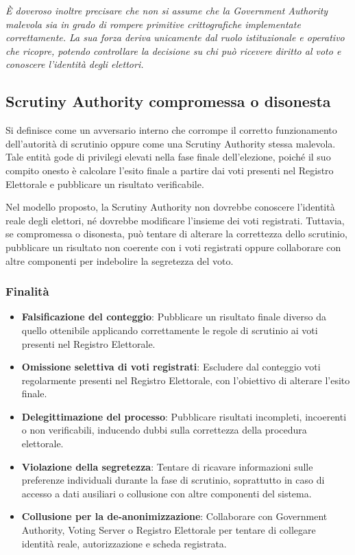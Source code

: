 \documentclass[a4paper,12pt]{article}
\begin{document}
\textit{È doveroso inoltre precisare che non si assume che la Government Authority malevola sia in grado di rompere primitive crittografiche implementate correttamente. La sua forza deriva unicamente dal ruolo istituzionale e operativo che ricopre, potendo controllare la decisione su chi può ricevere diritto al voto e conoscere l'identità degli elettori.}

\subsection{Scrutiny Authority compromessa o disonesta}

Si definisce come un avversario interno che corrompe il corretto funzionamento dell'autorità di scrutinio oppure come una Scrutiny Authority stessa malevola. Tale entità gode di privilegi elevati nella fase finale dell'elezione,
poiché il suo compito onesto è calcolare l'esito finale a partire dai voti presenti nel Registro Elettorale e pubblicare un risultato verificabile.

Nel modello proposto, la Scrutiny Authority non dovrebbe conoscere l'identità reale degli elettori, né dovrebbe modificare l'insieme dei voti registrati. Tuttavia, se compromessa o disonesta, può tentare di alterare la correttezza dello scrutinio, pubblicare un risultato non coerente con i voti registrati oppure collaborare con altre componenti per indebolire la segretezza del voto.

\subsubsection*{Finalità}

\begin{itemize}
    \item \textbf{Falsificazione del conteggio}: Pubblicare un risultato finale diverso da quello ottenibile applicando correttamente le regole di scrutinio ai voti presenti nel Registro Elettorale.

    \item \textbf{Omissione selettiva di voti registrati}: Escludere dal conteggio voti regolarmente presenti nel Registro Elettorale, con l'obiettivo di alterare l'esito finale.

    \item \textbf{Delegittimazione del processo}: Pubblicare risultati incompleti, incoerenti o non verificabili, inducendo dubbi sulla correttezza della procedura elettorale.

    \item \textbf{Violazione della segretezza}: Tentare di ricavare informazioni sulle preferenze individuali durante la fase di scrutinio, soprattutto in caso di accesso a dati ausiliari o collusione con altre componenti del sistema.

    \item \textbf{Collusione per la de-anonimizzazione}: Collaborare con Government Authority, Voting Server o Registro Elettorale per tentare di collegare identità reale, autorizzazione e scheda registrata.
\end{itemize}
\end{document}
